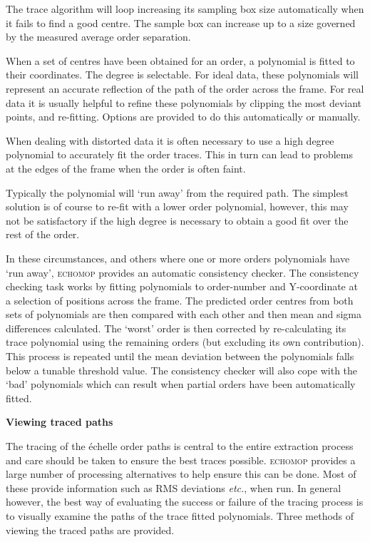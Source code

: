 \documentclass[twoside,11pt,nolof]{starlink}
\newcommand{\myindex}[1]{\index{#1}}
\begin{document}
The trace algorithm will loop increasing its sampling box size
automatically when it fails to find a good centre. The sample box can
increase up to a size governed by the measured average order separation.

When a set of centres have been obtained for an order, a polynomial is
fitted to their coordinates. The degree is selectable.
For ideal data, these polynomials will represent an accurate reflection
of the path of the order across the frame. For real data it is usually
helpful to refine these polynomials by clipping the most deviant points,
and re-fitting.  Options are provided to do this automatically or
manually.

When dealing with distorted data it is often necessary to use a high
degree polynomial to accurately fit the order traces. This in turn can
lead to problems at the edges of the frame when the order is often
faint.

Typically the polynomial will `run away' from the required path. The
simplest solution is of course to re-fit with a lower order polynomial,
however, this may not be satisfactory if the high degree is necessary to
obtain a good fit over the rest of the order.

In these circumstances, and others where one or more orders polynomials
have `run away', \textsc{echomop} provides an automatic consistency checker. The
consistency checking task works by fitting polynomials to order-number and
Y-coordinate at a selection of positions across the frame.
\myindex{Trace!consistency} The predicted order centres from both sets of
polynomials are then compared with each other and then mean and sigma
differences calculated. The `worst' order is then corrected by
re-calculating its trace polynomial using the remaining orders (but
excluding its own contribution). This process is repeated until the mean
deviation between the polynomials falls below a tunable threshold
value. The consistency checker will also cope with the `bad' polynomials
which can result when partial orders have been automatically fitted.

\newpage
{\large\bf Viewing traced paths}

The tracing of the \'{e}chelle order paths is central to the entire
extraction process and care should be taken to ensure the best traces
possible. \textsc{echomop} provides a large number of processing alternatives to
help ensure this can be done. Most of these provide information such as
RMS deviations {\it etc.}, when run. In general however, the best way of
evaluating the success or failure of the tracing process is to visually
examine the paths of the trace fitted polynomials. Three methods of
viewing the traced paths are provided. \myindex{Order!viewing traces}
\end{document}
